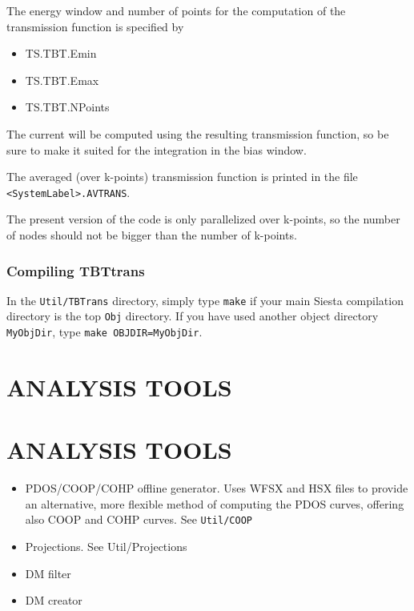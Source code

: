 \documentclass[11pt]{article}
\begin{document}
The energy window and number of points for the computation of the 
transmission function is specified by
\begin{itemize}
\item TS.TBT.Emin 
\item TS.TBT.Emax 
\item TS.TBT.NPoints
\end{itemize}
The current will be computed using the resulting transmission function, 
so be sure to make it suited for the integration in the bias window. 

The averaged (over k-points) transmission function is printed in 
the file {\tt <SystemLabel>.AVTRANS}.

The present version of the code is only parallelized over 
k-points, so the number of nodes should not be bigger than 
the number of k-points.

\subsubsection{Compiling TBTtrans}

In the {\tt Util/TBTrans} directory, simply type {\tt make} if your
main {\sc Siesta} compilation directory is the top {\tt Obj}
directory. If you have used another object directory {\tt MyObjDir},
type {\tt make OBJDIR=MyObjDir}.

\section{ANALYSIS TOOLS}
\section{ANALYSIS TOOLS}

\begin{itemize}

\item PDOS/COOP/COHP offline generator.
%
Uses WFSX and HSX files to provide an alternative, more flexible
method of computing the PDOS curves, offering also COOP and COHP
curves. See {\tt Util/COOP}

\item Projections.
%
See Util/Projections

\item DM filter

\item DM creator

\end{itemize}
\end{document}
